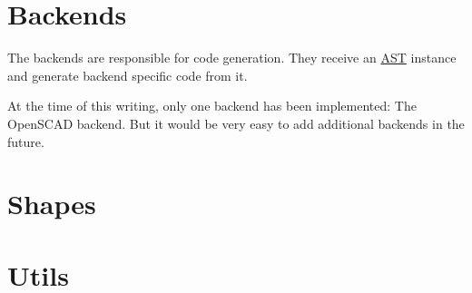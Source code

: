 \section{Backends}\label{sec:backends}

The backends are responsible for code generation. They receive an
\hyperref[sec:ast]{AST} instance and generate backend specific code from it.

At the time of this writing, only one backend has been implemented: The OpenSCAD
backend. But it would be very easy to add additional backends in the future.


\section{Shapes}\label{sec:shapes}


\section{Utils}\label{sec:utils}
